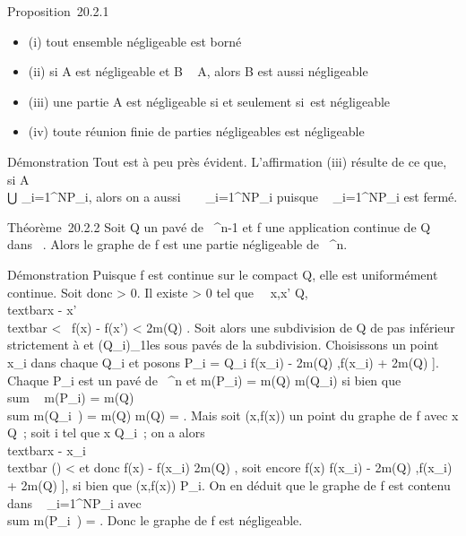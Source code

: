 \documentclass[]{article}
\begin{document}
Proposition~20.2.1

\begin{itemize}
\itemsep1pt\parskip0pt
\item
  (i) tout ensemble négligeable est borné
\item
  (ii) si A est négligeable et B \subset~ A, alors B est aussi négligeable
\item
  (iii) une partie A est négligeable si et seulement
  si~\overlineA est négligeable
\item
  (iv) toute réunion finie de parties négligeables est négligeable
\end{itemize}

Démonstration Tout est à peu près évident. L'affirmation (iii) résulte
de ce que, si A \subset~\\⋃
 \_i=1^NP\_i, alors on a aussi
\overlineA
\subset~\⋃ ~
\_i=1^NP\_i puisque
\⋃ ~
\_i=1^NP\_i est fermé.

Théorème~20.2.2 Soit Q un pavé de ~^n-1 et f une application
continue de Q dans ~. Alors le graphe de f est une partie négligeable de
~^n.

Démonstration Puisque f est continue sur le compact Q, elle est
uniformément continue. Soit donc \epsilon \textgreater{} 0. Il existe \eta
\textgreater{} 0 tel que \forall~~x,x' \in Q,
\\textbar{}x - x'\\textbar{} \textless{} \eta
\rigtharrow~\textbar{}f(x) - f(x')\textbar{} \textless{} \epsilon \over
2m(Q) . Soit alors \sigma une subdivision de Q de pas inférieur strictement
à \eta et (Q\_i)\_1\leqi\leqN les sous pavés de la subdivision.
Choisissons un point x\_i dans chaque Q\_i et posons
P\_i = Q\_i \times {[}f(x\_i) - \epsilon
\over 2m(Q) ,f(x\_i) + \epsilon \over
2m(Q) {]}. Chaque P\_i est un pavé de ~^n et
m(P\_i) = \epsilon \over m(Q) m(Q\_i) si
bien que \\sum ~
m(P\_i) = \epsilon \over m(Q)
 \\sum  m(Q\_i~)
= \epsilon \over m(Q) m(Q) = \epsilon. Mais soit (x,f(x)) un point
du graphe de f avec x \in Q~; soit i tel que x \in Q\_i~; on a alors
\\textbar{}x - x\_i\\textbar{} \leq
\delta(\sigma) \textless{} \eta et donc \textbar{}f(x) - f(x\_i)\textbar{}\leq
\epsilon \over 2m(Q) , soit encore f(x) \in {[}f(x\_i)
- \epsilon \over 2m(Q) ,f(x\_i) + \epsilon
\over 2m(Q) {]}, si bien que (x,f(x)) \in P\_i.
On en déduit que le graphe de f est contenu dans
\⋃ ~
\_i=1^NP\_i avec
\\sum  m(P\_i~) =
\epsilon. Donc le graphe de f est négligeable.
\end{document}
